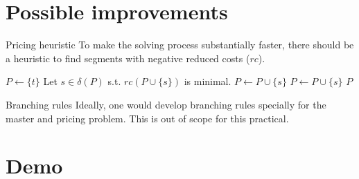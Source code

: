 \documentclass[fleqn]{beamer}
\begin{document}
	\section{Possible improvements}
    \begin{frame}{Pricing heuristic}
        To make the solving process substantially faster,
        there should be a heuristic to find segments with negative reduced costs ($rc$).
        
        \begin{algorithm}[H]
            \caption{Simple pricing heuristic}
            \begin{algorithmic}[1]
                \State $P\gets\{t\}$
                \State Let $s\in\delta(P)$ s.t. $rc(P\cup\{s\})$ is minimal. \label{nextnode}
                    \State $P\gets P\cup\{s\}$
                    \State {}
                    \State $P\gets P\cup\{s\}$
                    \State {}
                \Else
                    \State \Return $P$
                \EndIf
            \end{algorithmic}
        \end{algorithm}
    \end{frame}

    \begin{frame}{Branching rules}
        Ideally, one would develop branching rules specially for the master and pricing problem.
        This is out of scope for this practical.
    \end{frame}
    
    \section{Demo}
\end{document}
